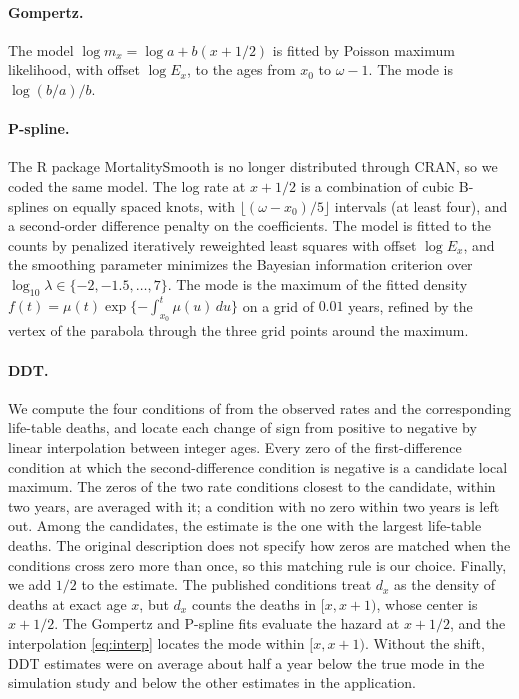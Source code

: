 \documentclass[12pt, letterpaper]{article}
\begin{document}
\paragraph{Gompertz.} The model $\log m_x = \log a + b(x + 1/2)$ is fitted by Poisson maximum likelihood, with offset $\log E_x$, to the ages from $x_0$ to $\omega - 1$. The mode is $\log(b/a)/b$.

\paragraph{P-spline.} The R package MortalitySmooth \citep{camarda2012mortalitysmooth} is no longer distributed through CRAN, so we coded the same model. The log rate at $x + 1/2$ is a combination of cubic B-splines on equally spaced knots, with $\lfloor (\omega - x_0)/5 \rfloor$ intervals (at least four), and a second-order difference penalty on the coefficients. The model is fitted to the counts by penalized iteratively reweighted least squares with offset $\log E_x$, and the smoothing parameter minimizes the Bayesian information criterion over $\log_{10} \lambda \in \{-2, -1.5, \dots, 7\}$. The mode is the maximum of the fitted density $f(t) = \mu(t) \exp\{-\int_{x_0}^{t} \mu(u)\, du\}$ on a grid of $0.01$ years, refined by the vertex of the parabola through the three grid points around the maximum.

\paragraph{DDT.} We compute the four conditions of \citet[Equation 9]{vazquez2024longevity} from the observed rates and the corresponding life-table deaths, and locate each change of sign from positive to negative by linear interpolation between integer ages. Every zero of the first-difference condition at which the second-difference condition is negative is a candidate local maximum. The zeros of the two rate conditions closest to the candidate, within two years, are averaged with it; a condition with no zero within two years is left out. Among the candidates, the estimate is the one with the largest life-table deaths. The original description does not specify how zeros are matched when the conditions cross zero more than once, so this matching rule is our choice. Finally, we add $1/2$ to the estimate. The published conditions treat $d_x$ as the density of deaths at exact age $x$, but $d_x$ counts the deaths in $[x, x+1)$, whose center is $x + 1/2$. The Gompertz and P-spline fits evaluate the hazard at $x + 1/2$, and the interpolation \eqref{eq:interp} locates the mode within $[x, x+1)$. Without the shift, DDT estimates were on average about half a year below the true mode in the simulation study and below the other estimates in the application.
\end{document}
